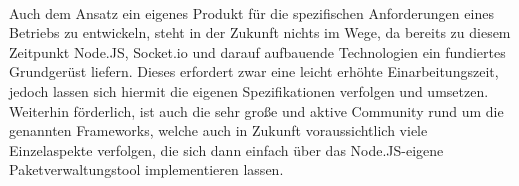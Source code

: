 \\ Auch dem Ansatz ein eigenes Produkt für die spezifischen Anforderungen eines Betriebs zu entwickeln, steht in der Zukunft nichts im Wege, da bereits zu diesem Zeitpunkt Node.JS, Socket.io und darauf aufbauende Technologien ein fundiertes Grundgerüst liefern. 
Dieses erfordert zwar eine leicht erhöhte Einarbeitungszeit, jedoch lassen sich hiermit die eigenen Spezifikationen verfolgen und umsetzen. Weiterhin förderlich, ist auch die sehr große und aktive Community rund um die genannten \Gls{Framework}s, welche auch in Zukunft voraussichtlich viele Einzelaspekte verfolgen, die sich dann einfach über das Node.JS-eigene Paketverwaltungstool implementieren lassen.








